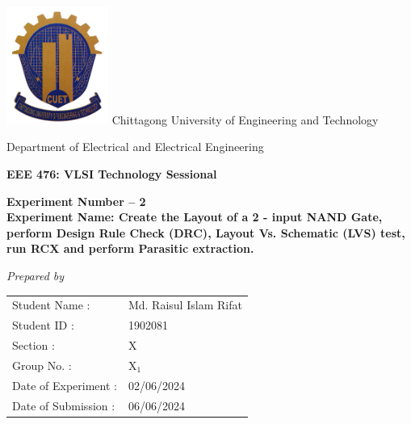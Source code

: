 \documentclass[11pt]{article}
\begin{document}
\begin{titlepage}
\begin{center}
\vspace*{3.5cm}
\includegraphics[width=0.25\textwidth,center]{cuet}
\vspace{1cm}
\huge
Chittagong University of Engineering and Technology

\LARGE
Department of Electrical and Electrical Engineering

\vspace{1cm}
\huge
\textbf{EEE 476: VLSI Technology Sessional}

\vspace{1cm}
\LARGE
\textbf{Experiment Number -- 2\\Experiment Name: Create the Layout of a 2 - input NAND Gate, perform Design Rule Check (DRC), Layout Vs. Schematic (LVS) test, run RCX and perform Parasitic extraction.}

\vspace{1cm}
\Large
\textit{Prepared by}\\
\vspace{0.5cm}
\setlength{\tabcolsep}{0.001pt}
\begin{tabularx}{\textwidth}{ 
   >{\raggedleft\arraybackslash}X 
   >{\raggedright\arraybackslash}X  }
Student Name : & \hspace{0.2cm}Md. Raisul Islam Rifat \\ 
Student ID : & \hspace{0.2cm}1902081 \\ 
Section : & \hspace{0.2cm}X \\ 
Group No. : & \hspace{0.2cm}$\text{X}_1$ \\ 
Date of Experiment : & \hspace{0.2cm}02/06/2024 \\ 
Date of Submission : & \hspace{0.2cm}06/06/2024 \\ 
\end{tabularx} 
\end{center}
\end{titlepage}
\end{document}
